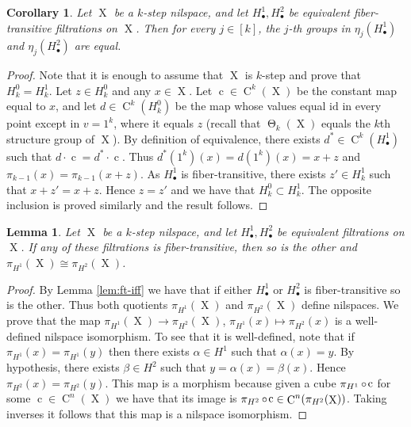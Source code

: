 \documentclass[a4paper,12pt,reqno]{amsart}
\newtheorem{lemma}[theorem]{Lemma}
\newtheorem{corollary}[theorem]{Corollary}
\theoremstyle{definition}
\def\to{\rightarrow}
\newcommand{\id}{\mathrm{id}}
\DeclareMathOperator{\tran}{\Theta}
\DeclareMathOperator{\q}{c}
\DeclareMathOperator{\ns}{X}
\DeclareMathOperator{\co}{\circ\hspace{-0.02 cm}}
\DeclareMathOperator{\cu}{C}
\begin{document}
\begin{corollary}\label{cor:same-last-str-gr}
Let $\ns$ be a $k$-step nilspace, and let $H^1_\bullet,H^2_\bullet$ be equivalent fiber-transitive filtrations on $\ns$. Then for every $j\in [k]$, the $j$-th groups in $\eta_j(H^1_\bullet)$ and $\eta_j(H^2_\bullet)$ are equal.
\end{corollary}

\begin{proof}
Note that it is enough to assume that $\ns$ is $k$-step and prove that $H^0_k=H^1_k$. Let $z\in H^0_k$ and any $x\in \ns$. Let $\q\in \cu^k(\ns)$ be the constant map equal to $x$, and let $d\in \cu^k(H^0_k)$ be the map whose values equal $\id$ in every point except in $v=1^k$, where it equals $z$ (recall that $\tran_k(\ns)$ equals the $k$th structure group of $\ns$). By definition of equivalence, there exists $d^*\in \cu^k(H^1_\bullet)$ such that $d\cdot \q=d^*\cdot \q$. Thus $d^*(1^k)(x)=d(1^k)(x)=x+z$ and $\pi_{k-1}(x)=\pi_{k-1}(x+z)$. As $H^1_\bullet$ is fiber-transitive, there exists $z'\in H_k^1$ such that $x+z'=x+z$. Hence $z=z'$ and we have that $H_k^0\subset H_k^1$. The opposite inclusion is proved similarly and the result follows.
\end{proof}

\begin{lemma}\label{lem:eq-sub-implies-eq-nil}
Let $\ns$ be a $k$-step nilspace, and let $H^1_\bullet,H^2_\bullet$ be equivalent filtrations on $\ns$.  If any of these filtrations is fiber-transitive, then so is the other and $\pi_{H^1}(\ns)\cong \pi_{H^2}(\ns)$.
\end{lemma}

\begin{proof}
By Lemma \ref{lem:ft-iff} we have that if either $H^1_\bullet$ or $H^2_\bullet$ is fiber-transitive so is the other. Thus both quotients $\pi_{H^1}(\ns)$ and $\pi_{H^2}(\ns)$ define nilspaces. We prove that the map $\pi_{H^1}(\ns) \to \pi_{H^2}(\ns)$, $\pi_{H^1}(x)\mapsto \pi_{H^2}(x)$ is a well-defined nilspace isomorphism. To see that it is well-defined, note that if $\pi_{H^1}(x)=\pi_{H^1}(y)$ then there exists $\alpha\in H^1$ such that $\alpha(x)=y$. By hypothesis, there exists $\beta\in H^2$ such that $y=\alpha(x)=\beta(x)$. Hence $\pi_{H^2}(x)=\pi_{H^2}(y)$. This map is a morphism because given a cube $\pi_{H^1}\co \q$ for some $\q\in\cu^n(\ns)$ we have that its image is $\pi_{H^2}\co \q\in\cu^n(\pi_{H^2}(\ns))$. Taking inverses it follows that this map is a nilspace isomorphism.
\end{proof}
\end{document}
